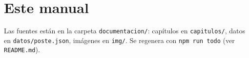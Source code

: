 \section{Este manual}
Las fuentes están en la carpeta \texttt{documentacion/}: capítulos en \texttt{capitulos/}, datos en \texttt{datos/poste.json}, imágenes en \texttt{img/}. Se regenera con \texttt{npm run todo} (ver \texttt{README.md}).
